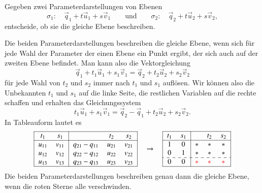 \begin{aufgabe}
Gegeben zwei Parameterdarstellungen von Ebenen
\begin{equation*}
\sigma_1:\quad
\vec{q}_1+t\vec{u}_1+s\vec{v}_1
\qquad\text{und}\qquad
\sigma_2:\quad
\vec{q}_2+t\vec{u}_2+s\vec{v}_2,
\end{equation*}
entscheide, ob sie die gleiche Ebene beschreiben.
\end{aufgabe}
Die beiden Parameterdarstellungen beschreiben die gleiche Ebene, wenn
sich für jede Wahl der Parameter der einen Ebene ein Punkt ergibt,
der sich auch auf der zweiten Ebene befindet.
Man kann also die Vektorgleichung
\[
\vec{q}_1+t_1\vec{u}_1+s_1\vec{v}_1
=
\vec{q}_2+t_2\vec{u}_2+s_2\vec{v}_2
\]
für jede Wahl von $t_2$ und $s_2$ immer nach $t_1$ und $s_1$ auflösen.
Wir können also die Unbekannten $t_1$ und $s_1$ auf die linke Seite, die
restlichen Variablen auf die rechte schaffen und erhalten das Gleichungssystem
\[
t_1\vec{u}_1+s_1\vec{v}_1
=
\vec{q}_2-
\vec{q}_1
+t_2\vec{u}_2+s_2\vec{v}_2.
\]
In Tableauform lautet es
\[
\begin{tabular}{| >{$}c<{$} >{$}c<{$}| >{$}c<{$} >{$}c<{$} >{$}c<{$}|}
\hline
t_1&s_1&&t_2&s_2\\
\hline
u_{11}&v_{11}&q_{21}-q_{11}&u_{21}&v_{21}\\
u_{12}&v_{12}&q_{22}-q_{12}&u_{22}&v_{22}\\
u_{13}&v_{13}&q_{23}-q_{13}&u_{23}&v_{23}\\
\hline
\end{tabular}
\quad\rightarrow\quad
\begin{tabular}{| >{$}c<{$} >{$}c<{$}| >{$}c<{$} >{$}c<{$} >{$}c<{$}|}
\hline
t_1&s_1&&t_2&s_2\\
\hline
1&0&*&*&*\\
0&1&*&*&*\\
\hdashline
0&0&\color{red}*&\color{red}*&\color{red}*\\
\hline
\end{tabular}
\]
Die beiden Parameterdarstellungen beschreiben genau dann die gleiche
Ebene, wenn die {\color{red}roten} Sterne alle verschwinden.

